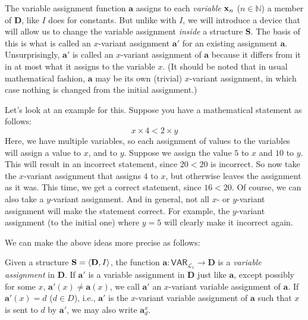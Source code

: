 The variable assignment function $\mathbf{a}$ assigns to each \textit{variable} $\mathbf{x}_{n}$ ($n \in \mathbb{N}$) a member of $\mathbf{D}$, like $I$ does for constants. But unlike with $I$, we will introduce a device that will allow us to change the variable assignment \textit{inside} a structure $\mathbf{S}$. The basis of this is what is called an $x$-variant assignment $\mathbf{a}'$ for an existing assignment $\mathbf{a}$. Unsurprisingly, $\mathbf{a}'$ is called an $x$-variant assignment of $\mathbf{a}$ because it differs from it in at most what it assigns to the variable $x$. (It should be noted that in usual mathematical fashion, $\mathbf{a}$ may be its own (trivial) $x$-variant assignment, in which case nothing is changed from the initial assignment.) 

Let's look at an example for this. Suppose you have a mathematical statement as follows:
\[
x \times 4 < 2 \times y
\]
Here, we have multiple variables, so each assignment of values to the variables will assign a value to $x$, and to $y$. Suppose we assign the value $5$ to $x$ and $10$ to $y$. This will result in an incorrect statement, since $20<20$ is incorrect. So now take the $x$-variant assignment that assigns $4$ to $x$, but otherwise leaves the assignment as it was. This time, we get a correct statement, since $16 <20$. Of course, we can also take a $y$-variant assignment. And in general, not all $x$- or $y$-variant assignment will make the statement correct. For example, the $y$-variant assignment (to the initial one) where $y=5$ will clearly make it incorrect again. 

We can make the above ideas more precise as follows:

\begin{defn}
Given a structure $\mathbf{S}=\langle\mathbf{D}, I\rangle$, the function $\mathbf{a}: \textsf{VAR}_{\mathcal{L}_1} \to \mathbf{D}$ is a \textit{variable assignment} in $\mathbf{D}$. If $\mathbf{a}'$ is a variable assignment in $\mathbf{D}$ just like $\mathbf{a}$, except possibly for some $x$, $\mathbf{a}'(x)\neq \mathbf{a}(x)$, we call $\mathbf{a}'$ an $x$-variant variable assignment of $\mathbf{a}$. If $\mathbf{a}'(x)=d$ ($d \in D$), i.e., $\mathbf{a}'$ is the $x$-variant variable assignment of $\mathbf{a}$ such that $x$ is sent to $d$ by $\mathbf{a}'$, we may also write $\mathbf{a}^x_d$.
\end{defn}

